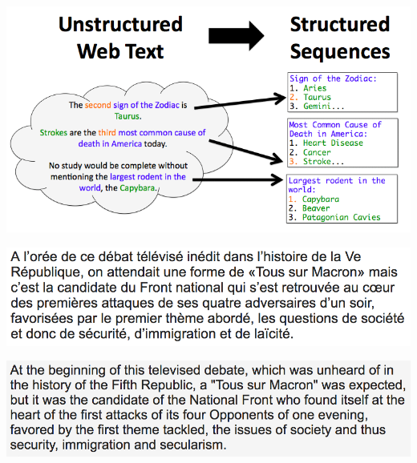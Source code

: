 \documentclass[landscape]{jhuslides3C}
\begin{document}

\vfill
\begin{center}
\includegraphics[width=20cm]{information-extraction.png}
\end{center}
\vfill


\vfill
\begin{center}
\includegraphics[width=27cm]{google-translate-mar2017-french-source.png}

\vspace{10mm}
\includegraphics[width=27cm]{google-translate-mar2017-french-target.png}
\end{center}
\vfill

\end{document}
